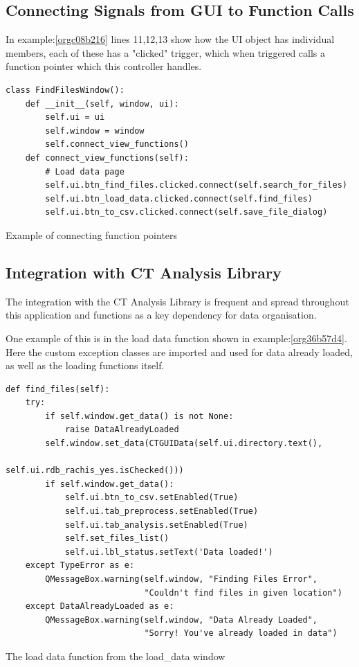 \documentclass[11pt]{report}
\begin{document}
\subsection{Connecting Signals from GUI to Function Calls}
\label{sec:org499f582}
In example:\ref{orgc08b216} lines 11,12,13 show how the UI object has individual members, each of these has a "clicked" trigger, which when triggered calls a function pointer which this controller handles.
\begin{listing}[htbp]
\begin{verbatim}
class FindFilesWindow():
    def __init__(self, window, ui):
        self.ui = ui
        self.window = window
        self.connect_view_functions()
    def connect_view_functions(self):
        # Load data page
        self.ui.btn_find_files.clicked.connect(self.search_for_files)
        self.ui.btn_load_data.clicked.connect(self.find_files)
        self.ui.btn_to_csv.clicked.connect(self.save_file_dialog)
\end{verbatim}
\caption{\label{orgc08b216}
Example of connecting function pointers}
\end{listing}

\subsection{Integration with CT Analysis Library}
\label{sec:org96329f2}

The integration with the CT Analysis Library is frequent and spread throughout this application and functions as a key dependency for data organisation.

One example of this is in the load data function shown in example:\ref{org36b57d4}. Here the custom exception classes are imported and used for data already loaded, as well as the loading functions itself.

\begin{listing}[htbp]
\begin{verbatim}
def find_files(self):
    try:
        if self.window.get_data() is not None:
            raise DataAlreadyLoaded
        self.window.set_data(CTGUIData(self.ui.directory.text(),
                                       self.ui.rdb_rachis_yes.isChecked()))
        if self.window.get_data():
            self.ui.btn_to_csv.setEnabled(True)
            self.ui.tab_preprocess.setEnabled(True)
            self.ui.tab_analysis.setEnabled(True)
            self.set_files_list()
            self.ui.lbl_status.setText('Data loaded!')
    except TypeError as e:
        QMessageBox.warning(self.window, "Finding Files Error",
                            "Couldn't find files in given location")
    except DataAlreadyLoaded as e:
        QMessageBox.warning(self.window, "Data Already Loaded",
                            "Sorry! You've already loaded in data")
\end{verbatim}
\caption{\label{org36b57d4}
The load data function from the load\_data window}
\end{listing}
\end{document}
